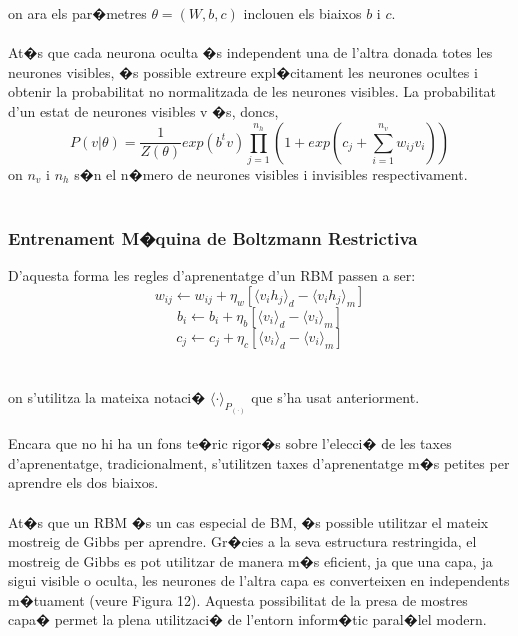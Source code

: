 \documentclass[12pt,a4paper,openright,oneside]{article}
\numberwithin{equation}{section}
\theoremstyle{definition}
\begin{document}
on ara els par�metres ${\theta = (W,b,c)}$ inclouen els biaixos ${b}$ i ${c}$.\\\\
At�s que cada neurona oculta �s independent una de l'altra donada totes les neurones visibles, �s possible extreure expl�citament les neurones ocultes i obtenir la probabilitat no normalitzada de les neurones visibles. La probabilitat d'un estat de neurones visibles v �s, doncs,
\begin{equation}
P(v|\theta) = \frac{1}{Z(\theta)}exp(b^tv)\prod_{j=1}^{n_h}(1 + exp(c_j + \sum_{i=1}^{n_v}w_{ij}v_i))
\end{equation}
on ${n_v}$ i ${n_h}$ s�n el n�mero de neurones visibles i invisibles respectivament.\\\\
\subsubsection{Entrenament M�quina de Boltzmann Restrictiva}
D'aquesta forma les regles d'aprenentatge d'un RBM passen a ser:
\begin{equation}
w_{ij}\leftarrow w_{ij} + \eta_w[\langle v_i h_j\rangle_d - \langle v_i h_j \rangle_m]
\end{equation}
\begin{equation}
b_{i}\leftarrow b_{i} + \eta_b[\langle v_i\rangle_d - \langle v_i  \rangle_m]
\end{equation}
\begin{equation}
c_{j}\leftarrow c_{j} + \eta_c[\langle v_i \rangle_d - \langle v_i \rangle_m]
\end{equation} \\\\
on s'utilitza la mateixa notaci� ${\langle \cdot \rangle_{P_{(\cdot)}}}$ que s'ha usat anteriorment. \\\\
Encara que no hi ha un fons te�ric rigor�s sobre l'elecci� de les taxes d'aprenentatge, tradicionalment, s'utilitzen taxes d'aprenentatge m�s petites per aprendre els dos biaixos.\\\\
At�s que un RBM �s un cas especial de BM, �s possible utilitzar el mateix mostreig de Gibbs per aprendre. Gr�cies a la seva estructura restringida, el mostreig de Gibbs es pot utilitzar de manera m�s eficient, ja que una capa, ja sigui visible o oculta, les neurones de l'altra capa es converteixen en independents m�tuament (veure Figura 12). Aquesta possibilitat de la presa de mostres capa� permet la plena utilitzaci� de l'entorn inform�tic paral�lel modern.\\\\
\end{document}
